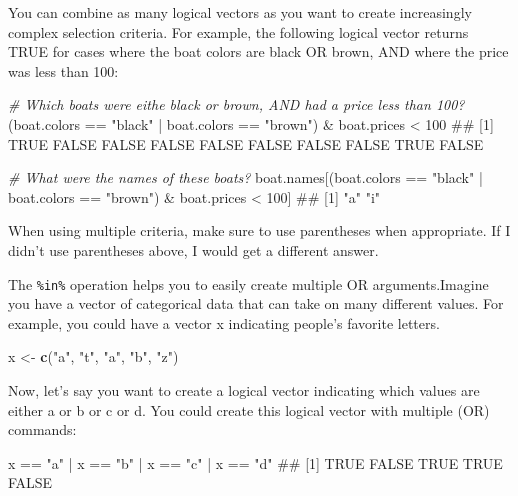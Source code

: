 \documentclass[]{book}
\newenvironment{Shaded}{\begin{snugshade}}{\end{snugshade}}
\newcommand{\KeywordTok}[1]{\textcolor[rgb]{0.13,0.29,0.53}{\textbf{{#1}}}}
\newcommand{\DecValTok}[1]{\textcolor[rgb]{0.00,0.00,0.81}{{#1}}}
\newcommand{\StringTok}[1]{\textcolor[rgb]{0.31,0.60,0.02}{{#1}}}
\newcommand{\CommentTok}[1]{\textcolor[rgb]{0.56,0.35,0.01}{\textit{{#1}}}}
\newcommand{\NormalTok}[1]{{#1}}
\theoremstyle{definition}
\theoremstyle{definition}
\theoremstyle{remark}
\begin{document}
You can combine as many logical vectors as you want to create
increasingly complex selection criteria. For example, the following
logical vector returns TRUE for cases where the boat colors are black OR
brown, AND where the price was less than 100:

\begin{Shaded}
\begin{Highlighting}[]
\CommentTok{# Which boats were eithe black or brown, AND had a price less than 100?}
\NormalTok{(boat.colors ==}\StringTok{ "black"} \NormalTok{|}\StringTok{ }\NormalTok{boat.colors ==}\StringTok{ "brown"}\NormalTok{) &}\StringTok{ }\NormalTok{boat.prices <}\StringTok{ }\DecValTok{100}
\NormalTok{##  [1]  TRUE FALSE FALSE FALSE FALSE FALSE FALSE FALSE  TRUE FALSE}

\CommentTok{# What were the names of these boats?}
\NormalTok{boat.names[(boat.colors ==}\StringTok{ "black"} \NormalTok{|}\StringTok{ }\NormalTok{boat.colors ==}\StringTok{ "brown"}\NormalTok{) &}\StringTok{ }\NormalTok{boat.prices <}\StringTok{ }\DecValTok{100}\NormalTok{]}
\NormalTok{## [1] "a" "i"}
\end{Highlighting}
\end{Shaded}

When using multiple criteria, make sure to use parentheses when
appropriate. If I didn't use parentheses above, I would get a different
answer.

The \texttt{\%in\%} operation helps you to easily create multiple OR
arguments.Imagine you have a vector of categorical data that can take on
many different values. For example, you could have a vector x indicating
people's favorite letters.

\begin{Shaded}
\begin{Highlighting}[]
\NormalTok{x <-}\StringTok{ }\KeywordTok{c}\NormalTok{(}\StringTok{"a"}\NormalTok{, }\StringTok{"t"}\NormalTok{, }\StringTok{"a"}\NormalTok{, }\StringTok{"b"}\NormalTok{, }\StringTok{"z"}\NormalTok{)}
\end{Highlighting}
\end{Shaded}

Now, let's say you want to create a logical vector indicating which
values are either a or b or c or d. You could create this logical vector
with multiple \textbar{} (OR) commands:

\begin{Shaded}
\begin{Highlighting}[]
\NormalTok{x ==}\StringTok{ "a"} \NormalTok{|}\StringTok{ }\NormalTok{x ==}\StringTok{ "b"} \NormalTok{|}\StringTok{ }\NormalTok{x ==}\StringTok{ "c"} \NormalTok{|}\StringTok{ }\NormalTok{x ==}\StringTok{ "d"}
\NormalTok{## [1]  TRUE FALSE  TRUE  TRUE FALSE}
\end{Highlighting}
\end{Shaded}
\end{document}
